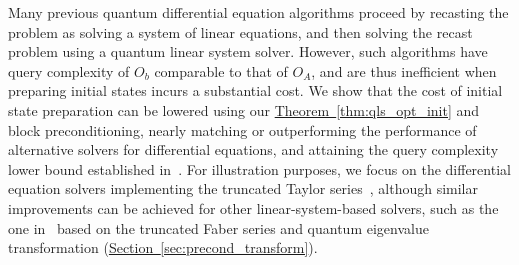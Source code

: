 \documentclass[letterpaper,onecolumn,11pt,accepted=2026-02-14]{quantumarticle}
\theoremstyle{remark}
\theoremstyle{plain}
\newcommand{\thm}[1]{\hyperref[thm:#1]{Theorem~\ref*{thm:#1}}}
\renewcommand{\sec}[1]{\hyperref[sec:#1]{Section~\ref*{sec:#1}}}
\begin{document}
Many previous quantum differential equation algorithms proceed by recasting the problem as solving a system of linear equations, and then solving the recast problem using a quantum linear system solver. However, such algorithms have query complexity of $O_{b}$ comparable to that of $O_{A}$, and are thus inefficient when preparing initial states incurs a substantial cost. We show that the cost of initial state preparation can be lowered using our \thm{qls_opt_init} and block preconditioning, nearly matching or outperforming the performance of alternative solvers for differential equations, and attaining the query complexity lower bound established in~\cite{Fang2023timemarchingbased}. For illustration purposes, we focus on the differential equation solvers implementing the truncated Taylor series~\cite{Berry2017Differential}, although similar improvements can be achieved for other linear-system-based solvers, such as the one in~\cite{QEVP} based on the truncated Faber series and quantum eigenvalue transformation (\sec{precond_transform}).
\end{document}
